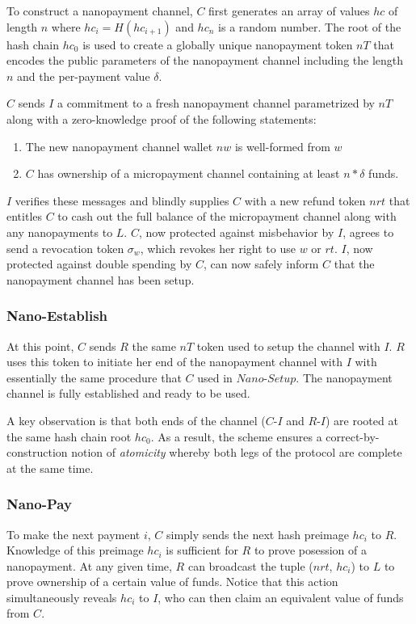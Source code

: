 To construct a nanopayment channel, $C$ first generates an array of values $hc$
of length $n$ where $hc_i = H(hc_{i+1})$ and $hc_n$ is a random number. The root
of the hash chain $hc_0$ is used to create a globally unique nanopayment
token $nT$ that encodes the public parameters of the nanopayment channel
including the length $n$ and the per-payment value $\delta$.

$C$ sends $I$ a commitment to a fresh nanopayment channel parametrized by $nT$ along
with a zero-knowledge proof of the following statements:

\begin{enumerate}
\item The new nanopayment channel wallet $nw$ is well-formed from $w$
\item $C$ has ownership of a micropayment channel containing at least $n *
  \delta$ funds.
\end{enumerate}

$I$ verifies these messages and blindly supplies $C$ with a new refund token $nrt$
that entitles $C$ to cash out the full balance of the micropayment channel along
with any nanopayments to $L$. $C$, now protected against misbehavior by $I$,
agrees to send a revocation token $\sigma_w$, which revokes her right to use $w$
or $rt$. $I$, now protected against double spending by $C$, can now safely
inform $C$ that the nanopayment channel has been setup.

\subsubsection{Nano-Establish}

At this point, $C$ sends $R$ the same $nT$ token used to setup the channel with
$I$. $R$ uses this token to initiate her end of the nanopayment channel with $I$
with essentially the same procedure that $C$ used in $Nano$-$Setup$. The
nanopayment channel is fully established and ready to be used.

A key observation is that both ends of the channel ($C$-$I$ and $R$-$I$)
are rooted at the same hash chain root $hc_0$. As a result, the scheme ensures
a correct-by-construction notion of \emph{atomicity} whereby both legs of the
protocol are complete at the same time.

\subsubsection{Nano-Pay}

To make the next payment $i$, $C$ simply sends the next hash preimage $hc_i$ to
$R$. Knowledge of this preimage $hc_i$ is sufficient for $R$ to prove posession
of a nanopayment. At any given time, $R$ can broadcast the tuple ($nrt$, $hc_i$)
to $L$ to prove ownership of a certain value of funds. Notice that this action
simultaneously reveals $hc_i$ to $I$, who can then claim an equivalent value of
funds from $C$.

